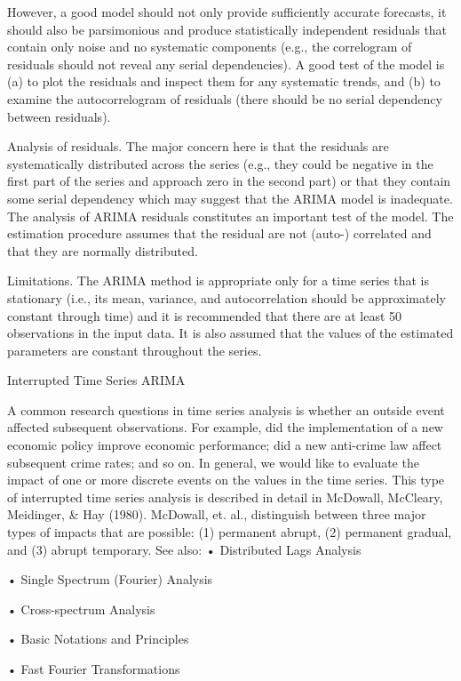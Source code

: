 However, a good model should not only provide sufficiently accurate forecasts, it should also be parsimonious and produce statistically independent residuals that contain only noise and no systematic components (e.g., the correlogram of residuals should not reveal any serial dependencies). A good test of the model is (a) to plot the residuals and inspect them for any systematic trends, and (b) to examine the autocorrelogram of residuals (there should be no serial dependency between residuals).

Analysis of residuals. The major concern here is that the residuals are systematically distributed across the series (e.g., they could be negative in the first part of the series and approach zero in the second part) or that they contain some serial dependency which may suggest that the ARIMA model is inadequate. The analysis of ARIMA residuals constitutes an important test of the model. The estimation procedure assumes that the residual are not (auto-) correlated and that they are normally distributed.

Limitations. The ARIMA method is appropriate only for a time series that is stationary (i.e., its mean, variance, and autocorrelation should be approximately constant through time) and it is recommended that there are at least 50 observations in the input data. It is also assumed that the values of the estimated parameters are constant throughout the series.

Interrupted Time Series ARIMA

A common research questions in time series analysis is whether an outside event affected subsequent observations. For example, did the implementation of a new economic policy improve economic performance; did a new anti-crime law affect subsequent crime rates; and so on. In general, we would like to evaluate the impact of one or more discrete events on the values in the time series. This type of interrupted time series analysis is described in detail in McDowall, McCleary, Meidinger, & Hay (1980). McDowall, et. al., distinguish between three major types of impacts that are possible: (1) permanent abrupt, (2) permanent gradual, and (3) abrupt temporary. See also:
•
Distributed Lags Analysis

•
Single Spectrum (Fourier) Analysis

•
Cross-spectrum Analysis

•
Basic Notations and Principles

•
Fast Fourier Transformations








